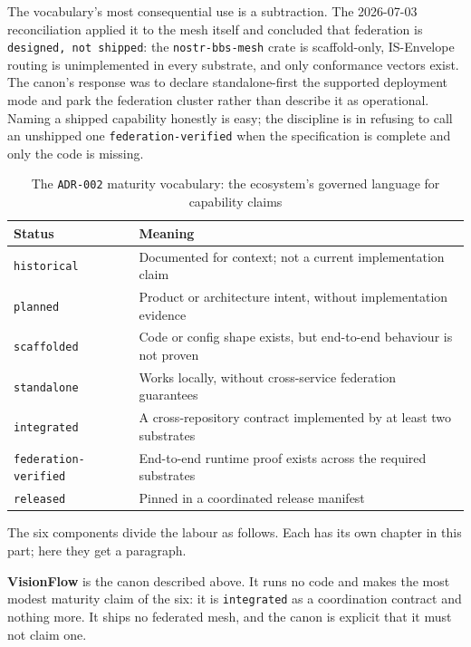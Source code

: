 The vocabulary's most consequential use is a subtraction. The 2026-07-03 reconciliation applied it to the mesh itself and concluded that federation is \texttt{designed, not shipped}: the \texttt{nostr-bbs-mesh} crate is scaffold-only, IS-Envelope routing is unimplemented in every substrate, and only conformance vectors exist. The canon's response was to declare standalone-first the supported deployment mode and park the federation cluster rather than describe it as operational. Naming a shipped capability honestly is easy; the discipline is in refusing to call an unshipped one \texttt{federation-verified} when the specification is complete and only the code is missing.

\begin{table}[h]
\centering
\caption{The \texttt{ADR-002} maturity vocabulary: the ecosystem's governed language for capability claims}
\label{tab:maturity-vocab}
\begin{tabularx}{\textwidth}{L{3.4cm} X}
\toprule
\textbf{Status} & \textbf{Meaning} \\
\midrule
\texttt{historical} & Documented for context; not a current implementation claim \\
\addlinespace
\texttt{planned} & Product or architecture intent, without implementation evidence \\
\addlinespace
\texttt{scaffolded} & Code or config shape exists, but end-to-end behaviour is not proven \\
\addlinespace
\texttt{standalone} & Works locally, without cross-service federation guarantees \\
\addlinespace
\texttt{integrated} & A cross-repository contract implemented by at least two substrates \\
\addlinespace
\texttt{federation-verified} & End-to-end runtime proof exists across the required substrates \\
\addlinespace
\texttt{released} & Pinned in a coordinated release manifest \\
\bottomrule
\end{tabularx}
\end{table}

The six components divide the labour as follows. Each has its own chapter in this part; here they get a paragraph.

\textbf{VisionFlow} is the canon described above. It runs no code and makes the most modest maturity claim of the six: it is \texttt{integrated} as a coordination contract and nothing more. It ships no federated mesh, and the canon is explicit that it must not claim one.

